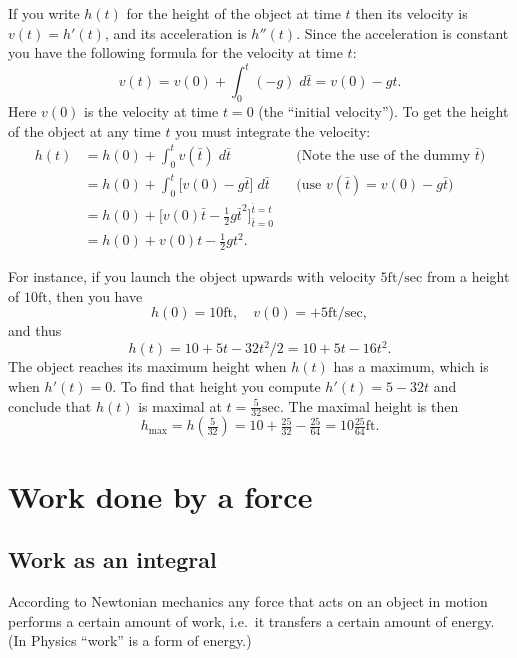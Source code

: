 If you write $h(t)$ for the height of the object at time $t$ then its velocity
is $v(t) = h'(t)$, and its acceleration is $h''(t)$.  Since the acceleration is
constant you have the following formula for the velocity at time $t$:
\[
v(t) = v(0) + \int_0^t (-g)\; d\bar t = v(0)-gt.
\]
Here $v(0)$ is the velocity at time $t=0$ (the ``initial velocity'').  To get
the height of the object at any time $t$ you must integrate the velocity:
\marginpar{\footnotesize%
}
\begin{align*}
  h(t) &= h(0) + \int_{0}^t v(\bar t)\;d\bar t
  &&\text{(Note the use of the dummy $\bar t$)}\\
  &=h(0) + \int_0^t \bigl[v(0) - g \bar t\bigr]\;d\bar t
  &&\text{(use $v(\bar t) = v(0)-g\bar t$)}\\
  &=h(0) + \bigl[v(0)\bar t -\tfrac12 g \bar t^2\bigr]_{\bar t=0}^{\bar t=t}\\
  &=h(0) + v(0) t -\tfrac12gt^2.
\end{align*}

For instance, if you launch the object upwards with velocity
$5\textrm{ft}/\textrm{sec}$ from a height of $10\textrm{ft}$, then you have
\[
h(0) = 10\textrm{ft},\quad v(0) = +5\textrm{ft}/\textrm{sec},
\]
and thus
\[
h(t) = 10 + 5t-32t^2/2 = 10+5t-16t^2.
\]
The object reaches its maximum height when $h(t)$ has a maximum, which is when
$h'(t)=0$.  To find that height you compute $h'(t) = 5-32t$ and conclude that
$h(t)$ is maximal at $t=\frac{5}{32}\textrm{sec}$.  The maximal height is then
\[
h_{\textrm{max}} = h(\tfrac5{32}) = 10+\tfrac{25}{32}-\tfrac{25}{64}=
10\tfrac{25}{64}\textrm{ft}.
\]



\section{Work done by a force} %

\subsection{Work as an integral} %
According to  Newtonian mechanics any force that acts on an object in motion
performs a certain amount of work, i.e.\ it transfers a certain amount of
energy.  (In Physics ``work'' is a form of energy.)
\begin{center}
  \small\sffamily\itshape%
   
\end{center}

